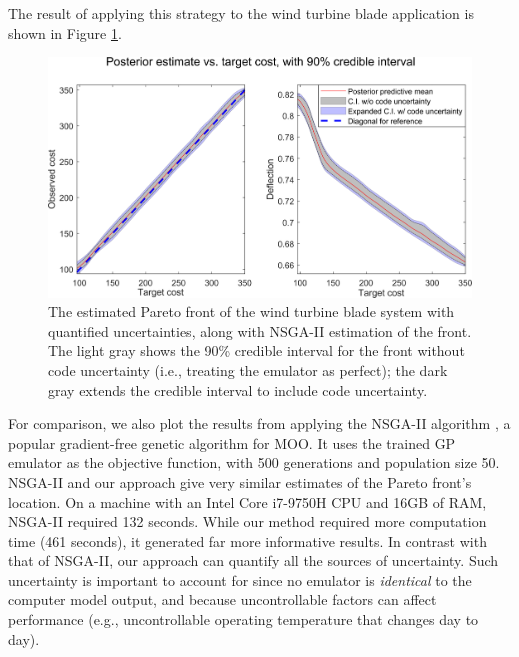 \documentclass[twocolumn,10pt]{asme2ej}
\begin{document}
%
%
%
The result of applying this strategy to the wind turbine blade application is shown in Figure \ref{fig:known_cost}. 
%
\begin{figure}[h]
	\centering
	\includegraphics[scale=.85]{FIG_cost_grid_pareto_bands}
	\caption{The estimated Pareto front of the wind turbine blade system with quantified uncertainties, along with NSGA-II estimation of the front. The light gray shows the 90\% credible interval for the front without code uncertainty (i.e., treating the emulator as perfect); the dark gray extends the credible interval to include code uncertainty.}
	\label{fig:known_cost}
\end{figure}
%
%
For comparison, we also plot the results from applying the NSGA-II algorithm \cite{Deb2002}, a popular gradient-free genetic algorithm for MOO. It uses the trained GP emulator as the objective function, with 500 generations and population size 50.
%
NSGA-II and our approach give very similar estimates of the Pareto front's location.
%
On a machine with an Intel Core i7-9750H CPU and 16GB of RAM, NSGA-II required 132 seconds.
%
While our method required more computation time (461 seconds), it generated far more informative results.
%
In contrast with that of NSGA-II, our approach can quantify all the sources of uncertainty. Such uncertainty is important to account for since no emulator is \textit{identical} to the computer model output, and because uncontrollable factors can affect performance (e.g., uncontrollable operating temperature that changes day to day).
%
%
%
\end{document}
